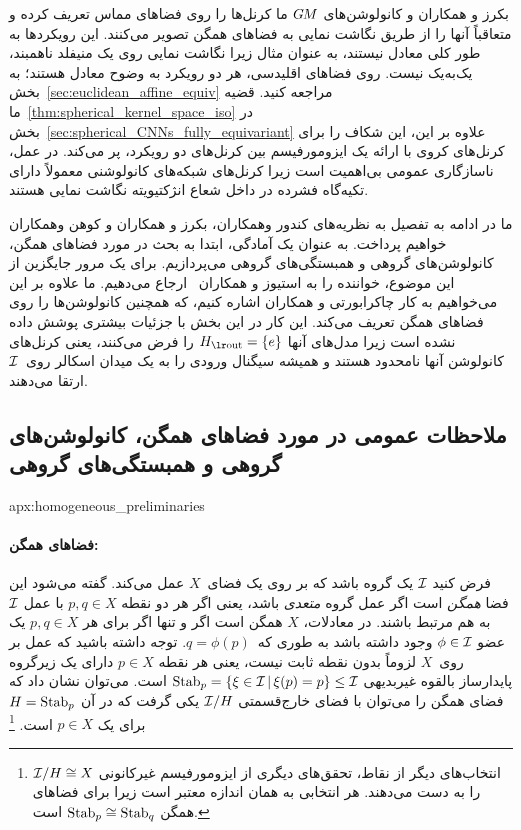 \begin{itemize}
	بکرز و همکاران\cite{bekkers2020bspline} و کانولوشن‌های $G\mkern-1.4muM$ ما کرنل‌ها را روی فضاهای مماس تعریف کرده و متعاقباً آنها را از طریق نگاشت نمایی به فضاهای همگن تصویر می‌کنند.
	این رویکردها به طور کلی معادل نیستند، به عنوان مثال زیرا نگاشت نمایی روی یک منیفلد ناهمبند، یک‌به‌یک نیست.
	روی فضاهای اقلیدسی، هر دو رویکرد به وضوح معادل هستند؛ به بخش~\ref{sec:euclidean_affine_equiv} مراجعه کنید.
	قضیه ما~\ref{thm:spherical_kernel_space_iso} در بخش~\ref{sec:spherical_CNNs_fully_equivariant} علاوه بر این، این شکاف را برای کرنل‌های کروی با ارائه یک ایزومورفیسم بین کرنل‌های دو رویکرد، پر می‌کند.
	در عمل، ناسازگاری عمومی بی‌اهمیت است زیرا کرنل‌های شبکه‌های کانولوشنی معمولاً دارای تکیه‌گاه فشرده در داخل شعاع انژکتیویته نگاشت نمایی هستند.
\end{itemize}

ما در ادامه به تفصیل به نظریه‌های
کندور وهمکاران\cite{Kondor2018-GENERAL}، بکرز و همکاران\cite{bekkers2020bspline} و کوهن وهمکاران\cite{Cohen2018-intertwiners}\cite{Cohen2019-generaltheory}
خواهیم پرداخت.
به عنوان یک آمادگی، ابتدا به بحث در مورد فضاهای همگن، کانولوشن‌های گروهی و همبستگی‌های گروهی می‌پردازیم.
برای یک مرور جایگزین از این موضوع، خواننده را به استیوز و همکاران~\cite{esteves2020theoretical} ارجاع می‌دهیم.
ما علاوه بر این می‌خواهیم به کار چاکرابورتی و همکاران\cite{chakraborty2018H-CNNs} اشاره کنیم، که همچنین کانولوشن‌ها را روی فضاهای همگن تعریف می‌کند.
این کار در این بخش با جزئیات بیشتری پوشش داده نشده است زیرا مدل‌های آنها $\Hout=\{e\}$ را فرض می‌کنند، یعنی کرنل‌های کانولوشن آنها نامحدود هستند و همیشه سیگنال ورودی را به یک میدان اسکالر روی~$\mathcal{I}$ ارتقا می‌دهند.






\toclesslab\subsection{ملاحظات عمومی در مورد فضاهای همگن، کانولوشن‌های گروهی و همبستگی‌های گروهی}{apx:homogeneous_preliminaries}

\paragraph{فضاهای همگن:}
فرض کنید $\mathcal{I}$ یک گروه باشد که بر روی یک فضای~$X$ عمل می‌کند.
گفته می‌شود این فضا \emph{همگن} است اگر عمل گروه \emph{متعدی} باشد، یعنی اگر هر دو نقطه $p,q\in X$ با عمل $\mathcal{I}$ به هم مرتبط باشند.
در معادلات، $X$ همگن است اگر و تنها اگر برای هر $p,q\in X$ یک عضو $\phi\in\mathcal{I}$ وجود داشته باشد به طوری که~$q=\phi(p)$.
توجه داشته باشید که عمل بر روی~$X$ لزوماً بدون نقطه ثابت نیست، یعنی هر نقطه $p\in X$ دارای یک زیرگروه پایدارساز بالقوه غیربدیهی $\operatorname{Stab}_{p} = {\{\xi\in\mathcal{I} \,|\, \xi(p)=p \}} \leq\mathcal{I}$ است.
می‌توان نشان داد که فضای همگن را می‌توان با فضای خارج‌قسمتی $\mathcal{I}/H$ یکی گرفت که در آن $H = \operatorname{Stab}_{p}$ برای یک $p\in X$ است.%
\footnote{
	انتخاب‌های دیگر از نقاط، تحقق‌های دیگری از ایزومورفیسم غیرکانونی $\mathcal{I}/H \cong X$ را به دست می‌دهند.
	هر انتخابی به همان اندازه معتبر است زیرا برای فضاهای همگن $\operatorname{Stab}_{p} \cong \operatorname{Stab}_{q}$ است.
}

